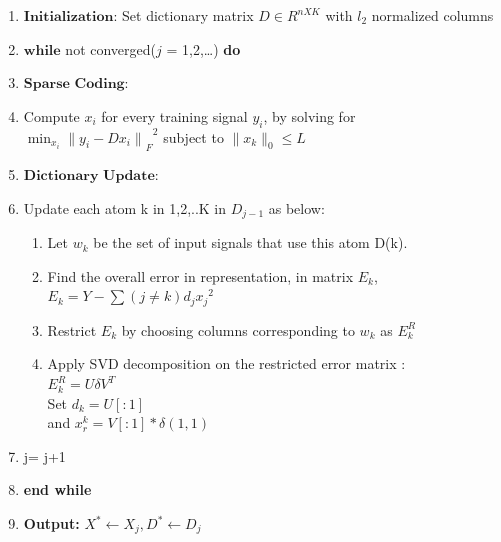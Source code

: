 \documentclass{article} %
\begin{document}
\begin{enumerate}
\item $\textbf{Initialization:}$  Set dictionary matrix $D  \in R^{nXK}$ with $l_2$ normalized columns
\item $\textbf{while}$ not converged($j$ = 1,2,\ldots) \textbf{do}
\item \hspace*{.4cm} $\textbf{Sparse Coding:}$ 
\item \hspace*{.8cm}Compute $x_i$ for every training signal $y_i$, by solving for\\
\hspace*{.8cm}$\min_{x_i}{{\|y_i-Dx_i\|}_F}^2$ subject to $\|x_k\|_0\leq L$
\item \hspace*{.4cm} $\textbf{Dictionary Update:}$ 
\item \hspace*{.8cm} Update each atom k in {1,2,..K} in $D_{j-1}$ as below:
\begin{enumerate}
\item \hspace*{.8cm} Let $w_k$ be the set of input signals that use this atom D(k).
\item \hspace*{.8cm} Find the overall error in representation, in matrix $E_k$,\\
\hspace*{.8cm} $E_k = Y - \sum(j \neq k){d_j{x_j}^2}$
\item \hspace*{.8cm} Restrict $E_k$ by choosing columns corresponding to $w_k$ as $E_k^R$
\item \hspace*{.8cm} Apply SVD decomposition on the restricted error matrix :\\
\hspace*{.8cm}$E_k^R = U\delta V^T$\\
\hspace*{.8cm}Set $d_k = U[:1]$\\
\hspace*{.8cm}and $x_r^k = V[:1]*\delta(1,1)$
\end{enumerate}
\item \hspace*{.8cm}j= j+1
\item \textbf{end while}
\item \textbf{Output: } $X^{*} \leftarrow X_j, D^{*} \leftarrow D_j$
\end{enumerate}
\end{document}
